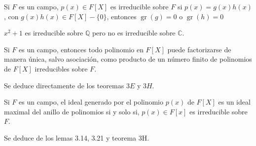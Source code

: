 \begin{definicion}
    Si $F$ es un campo, $p(x)\in F[X]$ es irreducible sobre $F$ si $p(x)=g(x)h(x)$, con $g(x)h(x)\in F[X]-\{0\}$, entonces $\operatorname{gr}(g)=0$ o $\operatorname{gr}(h)=0$
\end{definicion}

\begin{ejemplo}
    $x^2+1$ es irreducible sobre $\mathbb{Q}$ pero no es irreducible sobre $\mathbb{C}$.
\end{ejemplo}
\begin{lema}[3.21]
    Si $F$ es un campo, entonces todo polinomio en $F[X]$ puede factorizarse de manera única, salvo asociación, como producto de un número finito de polinomios de $F[X]$ irreducibles sobre $F$. 
    \begin{dem}
        Se deduce directamente de los teoremas $3E$ y $3H$.
    \end{dem}
\end{lema}

\begin{lema}[3.22]
    Si $F$ es un campo, el ideal generado por el polinomio $p(x)$ de $F[X]$ es un ideal maximal del anillo de polinomios si y solo si, $p(x)\in F[x]$ es irreducible sobre $F$. 
    \begin{dem}
        Se deduce de los lemas 3.14, 3.21 y teorema 3H. 
    \end{dem}
\end{lema}
